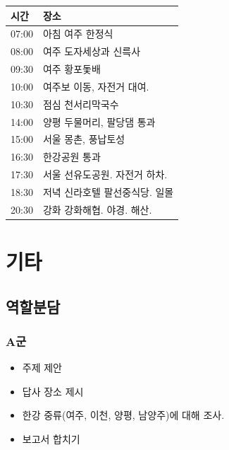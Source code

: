 \documentclass[chapter, oneside]{oblivoir}
\begin{document}
\begin{table}[ht]
    \begin{center}
    \begin{tabular}{rl}
    \multicolumn{1}{l}{시간}     & \multicolumn{1}{l}{장소} \\ \hline
    \multicolumn{1}{r|}{07:00} & 아침   여주 한정식         \\
    \multicolumn{1}{r|}{08:00} & 여주   도자세상과 신륵사      \\
    \multicolumn{1}{r|}{09:30} & 여주   황포돛배           \\
    \multicolumn{1}{r|}{10:00} & 여주보 이동, 자전거 대여.     \\
    \multicolumn{1}{r|}{10:30} & 점심   천서리막국수         \\
    \multicolumn{1}{r|}{14:00} & 양평 두물머리, 팔당댐 통과     \\
    \multicolumn{1}{r|}{15:00} & 서울 몽촌, 풍납토성         \\
    \multicolumn{1}{r|}{16:30} & 한강공원   통과           \\
    \multicolumn{1}{r|}{17:30} & 서울   선유도공원. 자전거 하차. \\
    \multicolumn{1}{r|}{18:30} & 저녁   신라호텔 팔선중식당. 일몰 \\
    \multicolumn{1}{r|}{20:30} & 강화   강화해협. 야경. 해산. 
    \end{tabular}   
    \end{center}
\end{table}






\chapter{기타}
\section{역할분담}
\subsection{A군}
\begin{itemize}
    \item 주제 제안
    \item 답사 장소 제시
    \item 한강 중류(여주, 이천, 양평, 남양주)에 대해 조사.
    \item {} 보고서 합치기
\end{itemize}
\end{document}
